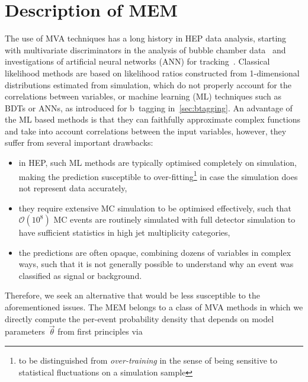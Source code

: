 \section{Description of MEM}
The use of MVA techniques has a long history in HEP data analysis, starting with multivariate discriminators in the analysis of bubble chamber data~\cite{VanDoninck:1984wd} and investigations of artificial neural networks (ANN) for tracking~\cite{Denby:1987rk}. Classical likelihood methods are based on likelihood ratios constructed from 1-dimensional distributions estimated from simulation, which do not properly account for the correlations between variables, or machine learning (ML) techniques such as BDTs or ANNs, as introduced for b~tagging in~\cref{sec:btagging}. An advantage of the ML based methods is that they can faithfully approximate complex functions and take into account correlations between the input variables, however, they suffer from several important drawbacks:

\begin{itemize}
\item in HEP, such ML methods are typically optimised completely on simulation, making the prediction susceptible to over-fitting\footnote{to be distinguished from \textit{over-training} in the sense of being sensitive to statistical fluctuations on a simulation sample} in case the simulation does not represent data accurately,
\item they require extensive MC simulation to be optimised effectively, such that $\mathcal{O}(10^8)$ MC events are routinely simulated with full detector simulation to have sufficient statistics in high jet multiplicity categories,
\item the predictions are often opaque, combining dozens of variables in complex ways, such that it is not generally possible to understand why an event was classified as signal or background.
\end{itemize}
Therefore, we seek an alternative that would be less susceptible to the aforementioned issues. The MEM belongs to a class of MVA methods in which we directly compute the per-event probability density that depends on model parameters~$\vec{\theta}$ from first principles via

